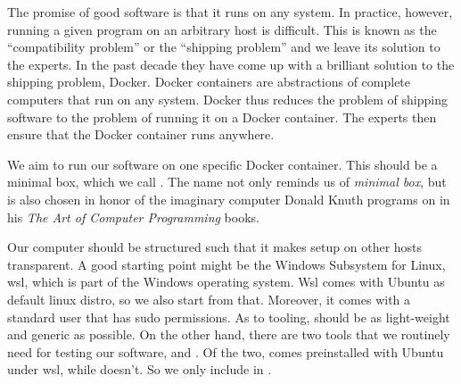 The promise of good software is that it runs on any system. In
practice, however, running a given program on an arbitrary host is
difficult. This is known as the ``compatibility problem'' or the
``shipping problem'' and we leave its solution to the experts. In the
past decade they have come up with a brilliant solution to the
shipping problem, Docker. Docker containers are abstractions of
complete computers that run on any system. Docker thus reduces the
problem of shipping software to the problem of running it on a Docker
container. The experts then ensure that the Docker container runs
anywhere.

We aim to run our software on one specific Docker container. This
should be a minimal box, which we call . The name not only
reminds us of \emph{minimal box}, but is also chosen in honor of the
imaginary computer  Donald Knuth programs on in his \emph{The
Art of Computer Programming} books.

Our computer  should be structured such that it makes setup on
other hosts transparent. A good starting point might be the Windows
Subsystem for Linux, wsl, which is part of the Windows operating
system. Wsl comes with Ubuntu as default linux distro, so we also
start from that. Moreover, it comes with a standard user that has sudo
permissions. As to tooling,  should be as light-weight and
generic as possible. On the other hand, there are two tools that we
routinely need for testing our software,  and . Of
the two,  comes preinstalled with Ubuntu under wsl, while
 doesn't. So we only include  in .
